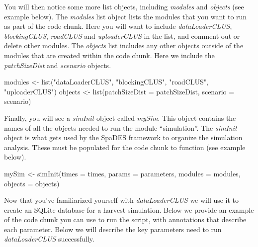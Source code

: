\documentclass[
]{article}
\newenvironment{Shaded}{\begin{snugshade}}{\end{snugshade}}
\newcommand{\AttributeTok}[1]{\textcolor[rgb]{0.77,0.63,0.00}{#1}}
\newcommand{\FunctionTok}[1]{\textcolor[rgb]{0.00,0.00,0.00}{#1}}
\newcommand{\NormalTok}[1]{#1}
\newcommand{\OtherTok}[1]{\textcolor[rgb]{0.56,0.35,0.01}{#1}}
\newcommand{\StringTok}[1]{\textcolor[rgb]{0.31,0.60,0.02}{#1}}
\begin{document}
You will then notice some more list objects, including \emph{modules}
and \emph{objects} (see example below). The \emph{modules} list object
lists the modules that you want to run as part of the code chunk. Here
you will want to include \emph{dataLoaderCLUS}, \emph{blockingCLUS},
\emph{roadCLUS} and \emph{uploaderCLUS} in the list, and comment out or
delete other modules. The \emph{objects} list includes any other objects
outside of the modules that are created within the code chunk. Here we
include the \emph{patchSizeDist} and \emph{scenario} objects.

\begin{Shaded}
\begin{Highlighting}[]
\NormalTok{modules }\OtherTok{\textless{}{-}} \FunctionTok{list}\NormalTok{(}\StringTok{"dataLoaderCLUS"}\NormalTok{, }
                \StringTok{"blockingCLUS"}\NormalTok{,}
                \StringTok{"roadCLUS"}\NormalTok{,}
                \StringTok{"uploaderCLUS"}\NormalTok{)}
\NormalTok{objects }\OtherTok{\textless{}{-}} \FunctionTok{list}\NormalTok{(}\AttributeTok{patchSizeDist =}\NormalTok{ patchSizeDist, }
                \AttributeTok{scenario =}\NormalTok{ scenario)}
\end{Highlighting}
\end{Shaded}

Finally, you will see a \emph{simInit} object called \emph{mySim}. This
object contains the names of all the objects needed to run the module
``simulation''. The \emph{simInit} object is what gets used by the
SpaDES framework to organize the simulation analysis. These must be
populated for the code chunk to function (see example below).

\begin{Shaded}
\begin{Highlighting}[]
\NormalTok{mySim }\OtherTok{\textless{}{-}} \FunctionTok{simInit}\NormalTok{(}\AttributeTok{times =}\NormalTok{ times, }
                 \AttributeTok{params =}\NormalTok{ parameters, }
                 \AttributeTok{modules =}\NormalTok{ modules,}
                 \AttributeTok{objects =}\NormalTok{ objects)}
\end{Highlighting}
\end{Shaded}

Now that you've familiarized yourself with \emph{dataLoaderCLUS} we will
use it to create an SQLite database for a harvest simulation. Below we
provide an example of the code chunk you can use to run the script, with
annotations that describe each parameter. Below we will describe the key
parameters need to run \emph{dataLoaderCLUS} successfully.
\end{document}
